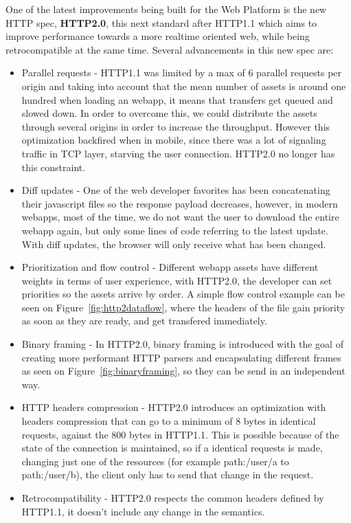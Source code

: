 One of the latest improvements being built for the Web Platform is the new HTTP spec, \textbf{HTTP2.0}\cite{Thomson2013}, this next standard after HTTP1.1 which aims to improve performance towards a more realtime oriented web, while being retrocompatible at the same time. Several advancements in this new spec are:

\begin{itemize}
  \item Parallel requests - HTTP1.1 was limited by a max of 6 parallel requests per origin and taking into account that the mean number of assets is around one hundred when loading an webapp, it means that transfers get queued and slowed down. In order to overcome this, we could distribute the assets through several origins in order to increase the throughput. However this optimization backfired when in mobile, since there was a lot of signaling traffic in TCP layer, starving the user connection. HTTP2.0 no longer has this constraint.
  \item Diff updates - One of the web developer favorites has been concatenating their javascript files so the response payload decreases, however, in modern webapps, most of the time, we do not want the user to download the entire webapp again, but only some lines of code referring to the latest update. With diff updates, the browser will only receive what has been changed.
  \item Prioritization and flow control - Different webapp assets have different weights in terms of user experience, with HTTP2.0, the developer can set priorities so the assets arrive by order.  A simple flow control example can be seen on Figure~\ref{fig:http2dataflow}, where the headers of the file gain priority as soon as they are ready, and get transfered immediately. 
  \item Binary framing - In HTTP2.0, binary framing is introduced with the goal of creating more performant HTTP parsers and encapsulating different frames as seen on Figure~\ref{fig:binaryframing}, so they can be send in an independent way.
  \item HTTP headers compression - HTTP2.0 introduces an optimization with headers compression\cite{Ruellan2013} that can go to a minimum of 8 bytes in identical requests, against the 800 bytes in HTTP1.1. This is possible because of the state of the connection is maintained, so if a identical requests is made, changing just one of the resources (for example path:/user/a to path:/user/b), the client only has to send that change in the request.
  \item Retrocompatibility - HTTP2.0 respects the common headers defined by HTTP1.1, it doesn't include any change in the semantics.
\end{itemize}

